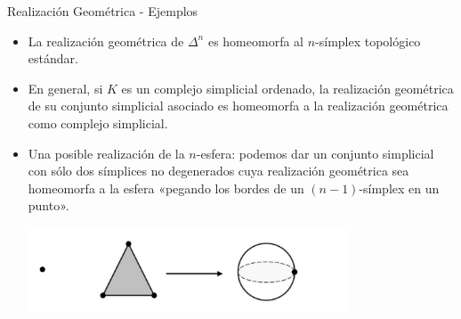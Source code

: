 \documentclass[11pt]{beamer}
\newcommand{\N}{\mathbb{N}}
\renewcommand{\ss}[1]{\Delta^{#1}}
\newcommand{\guill}[1]{«#1»}
\newtheorem{defs}{Definición}
\newtheorem{prop}{Proposición}
\newtheorem{lema}{Lema}
\begin{document}
\begin{frame}{Realización Geométrica - Ejemplos}
\begin{itemize}
\item <1-> La realización geométrica de $\ss{n}$ es homeomorfa al $n$-símplex topológico estándar.
\item <2-> En general, si $K$ es un complejo simplicial ordenado, la realización geométrica de su conjunto simplicial asociado es homeomorfa a la realización geométrica como complejo simplicial.
\item <3-> Una posible realización de la $n$-esfera: podemos dar un conjunto simplicial con sólo dos símplices no degenerados cuya realización geométrica sea homeomorfa a la esfera \guill{pegando los bordes de un $(n-1)$-símplex en un punto}.
\begin{center}
\begin{overprint}
\begin{center}
\includegraphics[width=0.75\textwidth]{modelo-simpl-nesfera.png}
\end{center}
\end{overprint}
\end{center}
\end{itemize}
\end{frame}

%
%
%
\end{document}

